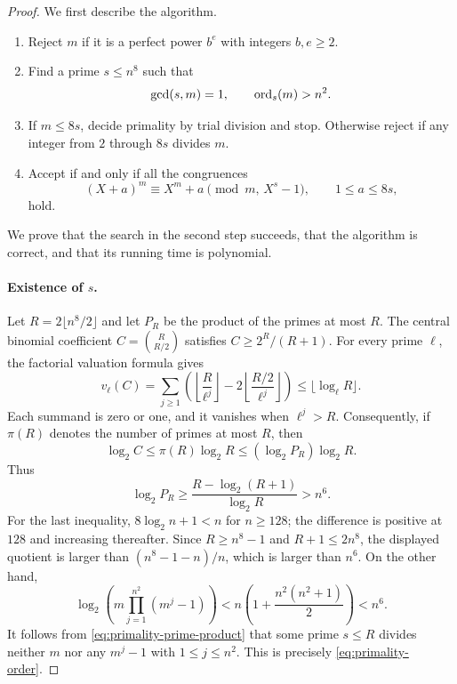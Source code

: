 \begin{proof}
We first describe the algorithm.
\begin{enumerate}
\item Reject $m$ if it is a perfect power $b^e$ with integers $b,e\ge2$.
\item Find a prime $s\le n^8$ such that
\begin{equation}\label{eq:primality-order}
 \gcd(s,m)=1,
 \qquad \operatorname{ord}_s(m)>n^2.
\end{equation}
\item If $m\le8s$, decide primality by trial division and stop.
Otherwise reject if any integer from $2$ through $8s$ divides $m$.
\item Accept if and only if all the congruences
\begin{equation}\label{eq:primality-congruences}
 (X+a)^m\equiv X^m+a\pmod{m,\,X^s-1},
 \qquad 1\le a\le8s,
\end{equation}
hold.
\end{enumerate}
We prove that the search in the second step succeeds, that the algorithm
is correct, and that its running time is polynomial.

\paragraph{Existence of $s$.}
Let $R=2\lfloor n^8/2\rfloor$ and let $P_R$ be the product of the primes
at most $R$.  The central binomial coefficient $C=\binom{R}{R/2}$ satisfies
$C\ge2^R/(R+1)$.  For every prime $\ell$, the factorial valuation formula gives
\[
 v_\ell(C)=\sum_{j\ge1}
 \left(\left\lfloor\frac{R}{\ell^j}\right\rfloor
       -2\left\lfloor\frac{R/2}{\ell^j}\right\rfloor\right)
 \le\lfloor\log_\ell R\rfloor.
\]
Each summand is zero or one, and it vanishes when $\ell^j>R$.
Consequently, if $\pi(R)$ denotes the number of primes at most $R$, then
\[
 \log_2 C\le\pi(R)\log_2 R
 \le(\log_2 P_R)\log_2 R.
\]
Thus
\begin{equation}\label{eq:primality-prime-product}
 \log_2 P_R
 \ge\frac{R-\log_2(R+1)}{\log_2 R}>n^6.
\end{equation}
For the last inequality, $8\log_2 n+1<n$ for $n\ge128$;
the difference is positive at $128$ and increasing thereafter.
Since $R\ge n^8-1$ and $R+1\le2n^8$, the displayed quotient is larger than
$(n^8-1-n)/n$, which is larger than $n^6$.
On the other hand,
\[
 \log_2\left(m\prod_{j=1}^{n^2}(m^j-1)\right)
 <n\left(1+\frac{n^2(n^2+1)}2\right)<n^6.
\]
It follows from \eqref{eq:primality-prime-product} that some prime
$s\le R$ divides neither $m$ nor any $m^j-1$ with $1\le j\le n^2$.
This is precisely \eqref{eq:primality-order}.


\end{proof}
